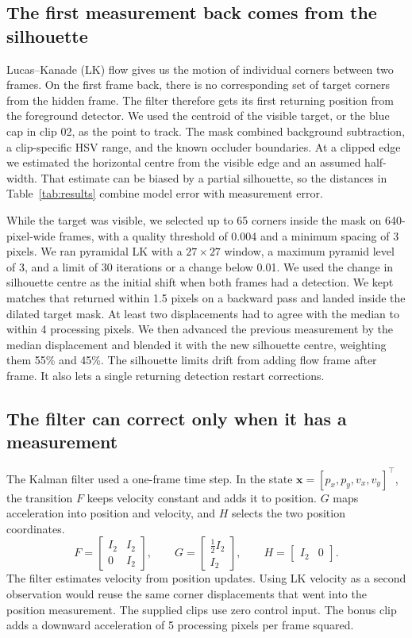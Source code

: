 \documentclass[conference]{assets/latex/IEEEtran}
\begin{document}
\subsection{The first measurement back comes from the silhouette}
Lucas--Kanade (LK) flow \cite{lucas1981} gives us the motion of
individual corners between two frames. On the first frame back, there
is no corresponding set of target corners from the hidden frame.
The filter therefore gets its first returning position from the
foreground detector. We used the centroid of the visible target,
or the blue cap in clip 02, as the point to track. The mask combined
background subtraction, a clip-specific HSV range, and the known
occluder boundaries. At a clipped edge we estimated the horizontal
centre from the visible edge and an assumed half-width. That estimate
can be biased by a partial silhouette, so the distances in
Table~\ref{tab:results} combine model error with measurement error.

While the target was visible, we selected up to 65 corners inside the
mask on 640-pixel-wide frames, with a quality threshold of 0.004
and a minimum spacing of 3 pixels. We ran pyramidal LK with a
$27\times27$ window, a maximum pyramid level of 3, and a limit of 30
iterations or a change below 0.01. We used the change in silhouette
centre as the initial shift when both frames had a detection. We kept
matches that returned within 1.5 pixels on a backward pass and landed
inside the dilated target mask. At least two displacements had to
agree with the median to within 4 processing pixels. We then advanced
the previous measurement by the median displacement and blended it
with the new silhouette centre, weighting them 55\% and 45\%.
The silhouette limits drift from adding flow frame after frame. It
also lets a single returning detection restart corrections.

\subsection{The filter can correct only when it has a measurement}
The Kalman filter \cite{kalman1960} used a one-frame time step.
In the state $\mathbf{x}=[p_x,p_y,v_x,v_y]^\top$, the transition $F$
keeps velocity constant and adds it to position.
$G$ maps acceleration into position and velocity, and $H$ selects
the two position coordinates.
\[
 F = \begin{bmatrix} I_2 & I_2 \\ 0 & I_2 \end{bmatrix},
 \qquad
 G = \begin{bmatrix} \tfrac{1}{2}I_2 \\ I_2 \end{bmatrix},
 \qquad
 H = \begin{bmatrix} I_2 & 0 \end{bmatrix}.
\]
The filter estimates velocity from position updates. Using LK velocity
as a second observation would reuse the same corner displacements that
went into the position measurement. The supplied clips use zero control
input. The bonus clip adds a downward acceleration of 5 processing
pixels per frame squared.
\end{document}

